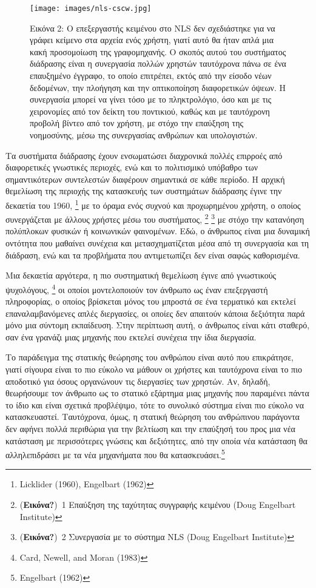 \documentclass[
]{article}
\begin{document}
\leavevmode{}%
\begin{figure}
\hypertarget{fig:nls-cscw}{%
\centering
\texttt{[image: images/nls-cscw.jpg]}
\caption{Εικόνα 2: Ο επεξεργαστής κειμένου στο NLS δεν σχεδιάστηκε για
να γράφει κείμενο στα αρχεία ενός χρήστη, γιατί αυτό θα ήταν απλά μια
κακή προσομοίωση της γραφομηχανής. Ο σκοπός αυτού του συστήματος
διάδρασης είναι η συνεργασία πολλών χρηστών ταυτόχρονα πάνω σε ένα
επαυξημένο έγγραφο, το οποίο επιτρέπει, εκτός από την είσοδο νέων
δεδομένων, την πλοήγηση και την οπτικοποίηση διαφορετικών όψεων. Η
συνεργασία μπορεί να γίνει τόσο με το πληκτρολόγιο, όσο και με τις
χειρονομίες από τον δείκτη του ποντικιού, καθώς και με ταυτόχρονη
προβολή βίντεο από τον χρήστη, με στόχο την επαύξηση της νοημοσύνης,
μέσω της συνεργασίας ανθρώπων και υπολογιστών.}\label{fig:nls-cscw}
}
\end{figure}

Τα συστήματα διάδρασης έχουν ενσωματώσει διαχρονικά πολλές επιρροές από
διαφορετικές γνωστικές περιοχές, ενώ και το πολιτισμικό υπόβαθρο των
σημαντικότερων συντελεστών διαφέρουν σημαντικά σε κάθε περίοδο. Η αρχική
θεμελίωση της περιοχής της κατασκευής των συστημάτων διάδρασης έγινε την
δεκαετία του 1960, \footnote{Licklider (1960), Engelbart (1962)} με το
όραμα ενός συχνού και προχωρημένου χρήστη, ο οποίος συνεργάζεται με
άλλους χρήστες μέσω του συστήματος, \footnote{(\textbf{Εικόνα?})~1
  Επαύξηση της ταχύτητας συγγραφής κειμένου (Doug Engelbart Institute)}
\footnote{(\textbf{Εικόνα?})~2 Συνεργασία με το σύστημα NLS (Doug
  Engelbart Institute)} με στόχο την κατανόηση πολύπλοκων φυσικών ή
κοινωνικών φαινομένων. Εδώ, ο άνθρωπος είναι μια δυναμική οντότητα που
μαθαίνει συνέχεια και μετασχηματίζεται μέσα από τη συνεργασία και τη
διάδραση, ενώ και τα προβλήματα που αντιμετωπίζει δεν είναι σαφώς
καθορισμένα.

Μια δεκαετία αργότερα, η πιο συστηματική θεμελίωση έγινε από γνωστικούς
ψυχολόγους, \footnote{Card, Newell, and Moran (1983)} οι οποίοι
μοντελοποιούν τον άνθρωπο ως έναν επεξεργαστή πληροφορίας, ο οποίος
βρίσκεται μόνος του μπροστά σε ένα τερματικό και εκτελεί
επαναλαμβανόμενες απλές διεργασίες, οι οποίες δεν απαιτούν κάποια
δεξιότητα παρά μόνο μια σύντομη εκπαίδευση. Στην περίπτωση αυτή, ο
άνθρωπος είναι κάτι σταθερό, σαν ένα γρανάζι μιας μηχανής που εκτελεί
συνέχεια την ίδια διεργασία.

Το παράδειγμα της στατικής θεώρησης του ανθρώπου είναι αυτό που
επικράτησε, γιατί σίγουρα είναι το πιο εύκολο να μάθουν οι χρήστες και
ταυτόχρονα είναι το πιο αποδοτικό για όσους οργανώνουν τις διεργασίες
των χρηστών. Αν, δηλαδή, θεωρήσουμε τον άνθρωπο ως το στατικό εξάρτημα
μιας μηχανής που παραμένει πάντα το ίδιο και είναι σχετικά προβλέψιμο,
τότε το συνολικό σύστημα είναι πιο εύκολο να κατασκευαστεί. Ταυτόχρονα,
όμως, η στατική θεώρηση του ανθρώπινου παράγοντα δεν αφήνει πολλά
περιθώρια για την βελτίωση και την επαύξησή του προς μια νέα κατάσταση
με περισσότερες γνώσεις και δεξιότητες, από την οποία νέα κατάσταση θα
αλληλεπιδράσει με τα νέα μηχανήματα που θα κατασκευάσει.\footnote{Engelbart
  (1962)}
\end{document}
